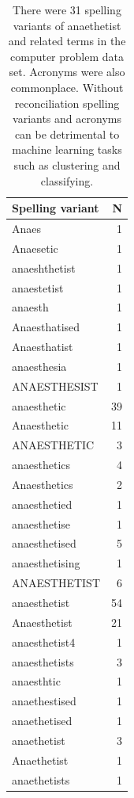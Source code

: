 \begin{table}[htbp]\centering
\begin{tabular}{lr}
\toprule
\textbf{Spelling variant} & {\textbf{N}} \\
\midrule
Anaes	& 1 \\
Anaesetic & 	1 \\
anaeshthetist &	1 \\
anaestetist & 1 \\
anaesth	& 1 \\
Anaesthatised &	1 \\
Anaesthatist &	1 \\
anaesthesia & 1 \\
ANAESTHESIST &	1 \\
anaesthetic &	39 \\
Anaesthetic &	11 \\
ANAESTHETIC &	3 \\
anaesthetics &	4 \\
Anaesthetics &	2 \\
anaesthetied &	1 \\
anaesthetise &	1 \\
anaesthetised &	5 \\
anaesthetising & 1 \\
ANAESTHETIST &	6 \\
anaesthetist & 54 \\
Anaesthetist & 21\\
anaesthetist4 &	1\\
anaesthetists & 3\\
anaesthtic & 1\\
anaethestised &	1\\
anaethetised & 1 \\
anaethetist &	3\\
Anaethetist &	1\\
anaethetists &	1\\
\end{tabular}
\label{tab:spelling variants of anethtist}
\caption{There were 31 spelling variants of anaethetist and related terms in the computer problem data set. Acronyms were also commonplace. Without reconciliation spelling variants and acronyms can be detrimental to machine learning tasks such as clustering and classifying.}
\end{table}



